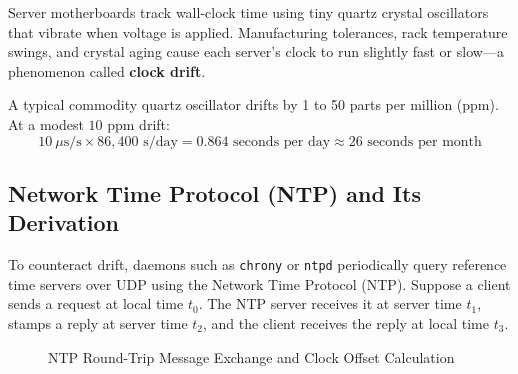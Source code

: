 Server motherboards track wall-clock time using tiny quartz crystal oscillators that vibrate when voltage is applied. Manufacturing tolerances, rack temperature swings, and crystal aging cause each server's clock to run slightly fast or slow---a phenomenon called \textbf{clock drift}.

A typical commodity quartz oscillator drifts by 1 to 50 parts per million (ppm). At a modest $10\text{ ppm}$ drift:
\begin{equation}
10\ \mu\text{s/s} \times 86{,}400\text{ s/day} = 0.864\text{ seconds per day} \approx 26\text{ seconds per month}
\end{equation}

\subsection{Network Time Protocol (NTP) and Its Derivation}

To counteract drift, daemons such as \texttt{chrony} or \texttt{ntpd} periodically query reference time servers over UDP using the Network Time Protocol (NTP). Suppose a client sends a request at local time $t_0$. The NTP server receives it at server time $t_1$, stamps a reply at server time $t_2$, and the client receives the reply at local time $t_3$.

\begin{figure}[htbp]
\centering
{}
\caption{NTP Round-Trip Message Exchange and Clock Offset Calculation}
\label{fig:v4-ch01-ntp-offset}
\end{figure}

